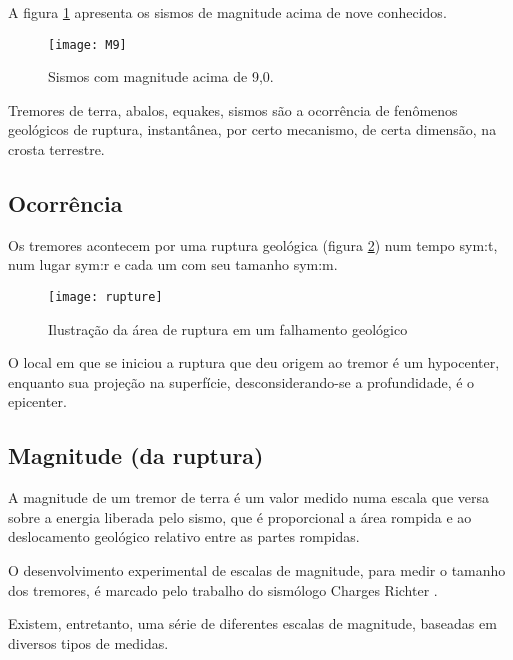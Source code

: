 A figura \ref{f:m9} apresenta os sismos de magnitude acima de nove conhecidos.

\begin{figure}[H]
   \centering
   \texttt{[image: M9]}
   \caption[Sismos com magnitude acima de 9,0.]
   		   {Sismos com magnitude acima de 9,0.} 
   \label{f:m9}
\end{figure} 


Tremores de terra, abalos, \glspl{equake}, sismos são a ocorrência de
fenômenos geológicos de ruptura, instantânea, por certo mecanismo, de certa dimensão, na
crosta terrestre.

\subsection{Ocorrência}
\label{sec:ocorrencia}
 
Os tremores acontecem por uma ruptura geológica (figura \ref{f:rupture}) num tempo \gls{sym:t}, num lugar \gls{sym:r} e cada um
com seu tamanho \gls{sym:m}.

\begin{figure}[H]
   \centering
   \texttt{[image: rupture]}
   \caption[Ilustração da área de ruptura em um falhamento geológico]
   		   {Ilustração da área de ruptura em um falhamento geológico\footnotemark} 
   \label{f:rupture}
\end{figure} 
 

O local em que se iniciou a ruptura que deu origem ao tremor é um \gls{hypocenter},
enquanto sua projeção na superfície, desconsiderando-se a profundidade, é o \gls{epicenter}.


\subsection{Magnitude (da ruptura)}
\label{sec:magnitude}

A magnitude de um tremor de terra é um valor medido numa escala que versa sobre a energia liberada pelo sismo, que é 
proporcional a área rompida e ao deslocamento geológico relativo entre as partes rompidas.

O desenvolvimento experimental de escalas de magnitude, para medir o tamanho dos tremores,
é marcado pelo trabalho do sismólogo Charges Richter \citep{richter_1935}.

Existem, entretanto, uma série de diferentes escalas de magnitude,
baseadas em diversos tipos de medidas. 

